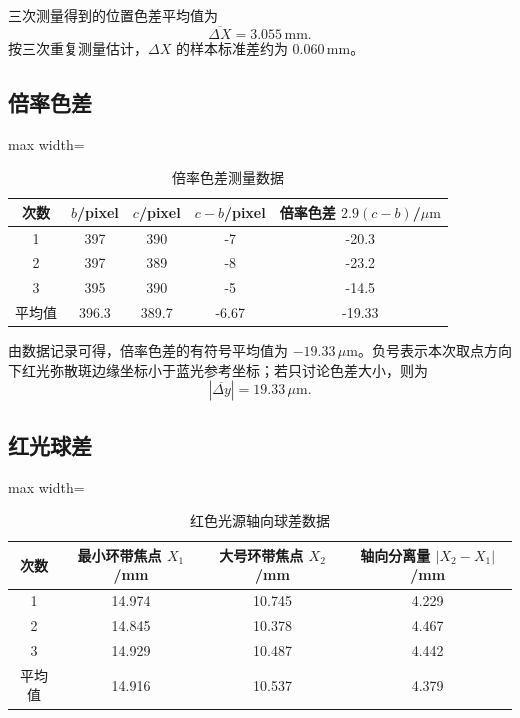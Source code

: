\documentclass[12pt,a4paper]{article}
\begin{document}
三次测量得到的位置色差平均值为
\begin{equation}
  \overline{\Delta X}=3.055\,\mathrm{mm}.
\end{equation}
按三次重复测量估计，$\Delta X$ 的样本标准差约为 $0.060\,\mathrm{mm}$。

\subsection{倍率色差}

\begin{table}[H]
  \centering
  \caption{倍率色差测量数据}
  \begin{adjustbox}{max width=\textwidth}
    \begin{tabular}{ccccc}
      \toprule
      次数 & $b$/pixel & $c$/pixel & $c-b$/pixel & 倍率色差 $2.9(c-b)$/$\mu\mathrm{m}$\\
      \midrule
      1 & 397 & 390 & -7 & -20.3\\
      2 & 397 & 389 & -8 & -23.2\\
      3 & 395 & 390 & -5 & -14.5\\
      \midrule
      平均值 & 396.3 & 389.7 & -6.67 & -19.33\\
      \bottomrule
    \end{tabular}
  \end{adjustbox}
\end{table}

由数据记录可得，倍率色差的有符号平均值为 $-19.33\,\mu\mathrm{m}$。负号表示本次取点方向下红光弥散斑边缘坐标小于蓝光参考坐标；若只讨论色差大小，则为
\begin{equation}
  |\overline{\Delta y}|=19.33\,\mu\mathrm{m}.
\end{equation}

\subsection{红光球差}

\begin{table}[H]
  \centering
  \caption{红色光源轴向球差数据}
  \begin{adjustbox}{max width=\textwidth}
    \begin{tabular}{cccc}
      \toprule
      次数 & 最小环带焦点 $X_1$/mm & 大号环带焦点 $X_2$/mm & 轴向分离量 $|X_2-X_1|$/mm\\
      \midrule
      1 & 14.974 & 10.745 & 4.229\\
      2 & 14.845 & 10.378 & 4.467\\
      3 & 14.929 & 10.487 & 4.442\\
      \midrule
      平均值 & 14.916 & 10.537 & 4.379\\
      \bottomrule
    \end{tabular}
  \end{adjustbox}
\end{table}
\end{document}

